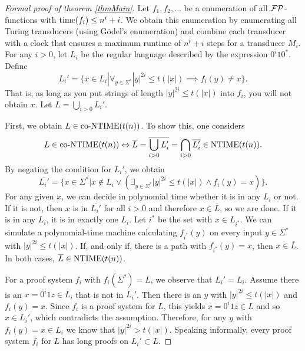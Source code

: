   \begin{proof}[Formal proof of theorem \ref{thmMain}]
    Let \(f_1, f_2, ...\) be a enumeration of all \(\mathcal{FP}\)-functions with \(\operatorname{time}(f_i) \leq n^i + i\).
    We obtain this enumeration by enumerating all Turing transducers (using Gödel's enumeration) and combine each transducer with a clock that ensures a maximum runtime of \(n^i + i\) steps for a transducer \(M_i\).
    For any \(i > 0\), let \(L_i\) be the regular language described by the expression \(0^i10^*\). Define
      \[ L_i' = \{ x \in L_i | \forall_{ y \in \Sigma^* } |y|^{2i} \leq t(|x|) \implies f_i(y) \neq x \}. \]
    That is, as long as you put strings of length \(|y|^{2i} \leq t(|x|)\) into \(f_i\), you will not obtain \(x\).
    Let \(L = \bigcup_{i > 0} L_i'\).

    First, we obtain \(L \in \text{co-NTIME}(t(n))\). To show this, one considers
      \[L \in \text{co-NTIME}(t(n)) \Leftrightarrow \overline{L} = \overline{\bigcup_{i > 0} L_i'} = \bigcap_{i > 0} \overline{L_i'} \in \text{NTIME}(t(n)).\]
    By negating the condition for \(L_i'\), we obtain
      \[ \overline{L_i'} = \{ x \in \Sigma^* | x \notin L_i \vee \left( \exists_{y \in \Sigma^*} |y|^{2i} \leq t(|x|) \wedge f_i(y) = x \right) \}. \]
    For any given \(x\), we can decide in polynomial time whether it is in any \(L_i\) or not. If it is not, then \(x\) is in \(\overline{L_i'}\) for all \(i > 0\) and therefore \(x \in \overline{L}\), so we are done. If it is in any \(L_i\), it is in exactly one \(L_i\). Let \(i^*\) be the set with \(x \in L_{i^*}\). We can simulate  a polynomial-time machine calculating \(f_{i^*}(y)\) on every input \(y \in \Sigma^*\) with \(|y|^{2i} \leq t(|x|)\). If, and only if, there is a path with \(f_{i^*}(y) = x\), then \(x \in \overline{L}\). In both cases, \(\overline{L} \in \text{NTIME}(t(n))\).

    For a proof system \(f_i\) with \(f_i(\Sigma^*) = L\), we observe that \(L_i' = L_i\). Assume there is an \(x = 0^i1z \in L_i\) that is not in \(L_i'\). Then there is an \(y\) with \(|y|^{2i} \leq t(|x|)\) and \(f_i(y) = x\). Since \(f_i\) is a proof system for \(L\), this yields \(x = 0^i1z \in L\) and so \(x \in L_i'\), which contradicts the assumption. Therefore, for any \(y\) with \(f_i(y) = x \in L_i\) we know that \(|y|^{2i} > t(|x|)\). Speaking informally, every proof system \(f_i\) for \(L\) has long proofs on \(L_i' \subset L\).


\end{proof}
